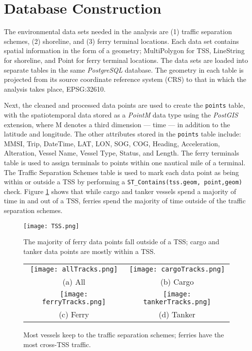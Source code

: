 \documentclass[twoside,symmetric,notoc]{tufte-book}
\begin{document}
\section{Database Construction}
\par{%
The environmental data sets needed in the analysis are (1) traffic separation schemes, (2) shoreline, and (3) ferry terminal locations. Each data set contains spatial information in the form of a geometry; MultiPolygon for TSS, LineString for shoreline, and Point for ferry terminal locations. The data sets are loaded into separate tables in the same \textit{PostgreSQL} database. The geometry in each table is projected from its source coordinate reference system (CRS) to that in which the analysis takes place, EPSG:32610.
}
\par{%
Next, the cleaned and processed data points are used to create the \texttt{points} table, with the spatiotemporal data stored as a \textit{PointM} data type using the \textit{PostGIS} extension, where M denotes a third dimension --- time --- in addition to the latitude and longitude. The other attributes stored in the \texttt{points} table include: MMSI, Trip, DateTime, LAT, LON, SOG, COG, Heading, Acceleration,  Alteration, Vessel Name, Vessel Type, Status, and Length. The ferry terminals table is used to assign terminals to points within one nautical mile of a terminal. The Traffic Separation Schemes table is used to mark each data point as being within or outside a TSS by performing a \texttt{ST_Contains(tss.geom, point,geom)} check. Figure \ref{fig:in_tss} shows that while cargo and tanker vessels spend a majority of time in and out of a TSS, ferries spend the majority of time outside of the traffic separation schemes.
\begin{figure}
    \centering
    \texttt{[image: TSS.png]}
    \caption{The majority of ferry data points fall outside of a TSS; cargo and tanker data points are mostly within a TSS.}
    \label{fig:in_tss}
\end{figure}
}
\begin{figure*}
\begin{tabular}{cc}
  \texttt{[image: allTracks.png]} &   
  \texttt{[image: cargoTracks.png]} \\
(a) All & (b) Cargo \\[6pt]
 \texttt{[image: ferryTracks.png]} &  
 \texttt{[image: tankerTracks.png]} \\
(c) Ferry & (d) Tanker \\[6pt]
\end{tabular}
\caption{Most vessels keep to the traffic separation schemes; ferries have the most cross-TSS traffic.}
\label{fig:tracks}
\forcerectofloat
\end{figure*}
\end{document}
